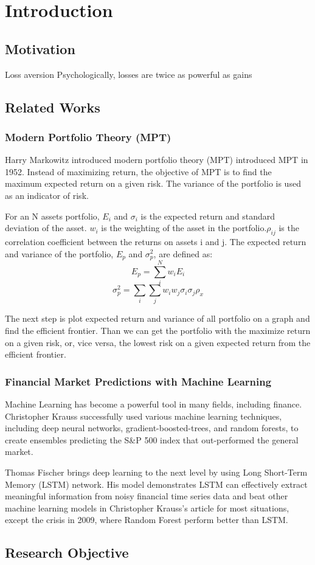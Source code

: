 \chapter{Introduction}

\section {Motivation}
Loss aversion Psychologically, losses are twice as powerful as gains \cite{Tversky1992}

\section {Related Works}
\subsection{Modern Portfolio Theory (MPT)}
Harry Markowitz introduced modern portfolio theory (MPT) introduced MPT in 1952\cite{10.2307/2975974}. Instead of maximizing return, the objective of MPT is to find the maximum expected return on a given risk. The variance of the portfolio is used as an indicator of risk. 
\par
For an N assets portfolio, \(E_i\) and  \(\sigma_i\) is the expected return and standard deviation of the asset. \(w_i\) is the weighting of the asset in the portfolio.\(\rho_{ij}\) is the correlation coefficient between the returns on assets i and j.
The expected return and variance of the portfolio, \(E_p\) and \(\sigma_p^2\), are defined as:
\[ E_p = \sum_i^N w_i E_i\]
\[\sigma_p^2 = \sum_i \sum_j w_i w_j \sigma_i \sigma_j \rho_x\]
\par
The next step is plot expected return and variance of all portfolio on a graph and find the efficient frontier. Than we can get the portfolio with the maximize return on a given risk, or, vice versa, the lowest risk on a given expected return from the efficient frontier.

\subsection{Financial Market Predictions with Machine Learning}
Machine Learning has become a powerful tool in many fields, including finance. Christopher Krauss successfully used various machine learning techniques, including deep neural networks, gradient-boosted-trees, and random forests, to create ensembles predicting the S\&P 500 index that out-performed the general market. \cite{KRAUSS2017689} 
\par
Thomas Fischer brings deep learning to the next level by using Long Short-Term Memory (LSTM) network.\cite{FISCHER2018654} His model demonstrates LSTM can effectively extract meaningful information from noisy financial time series data and beat other machine learning models in  Christopher Krauss's article  \cite{KRAUSS2017689} for most situations, except the crisis in 2009, where Random Forest perform better than LSTM.
\section {Research Objective}

\label{c:intro}

